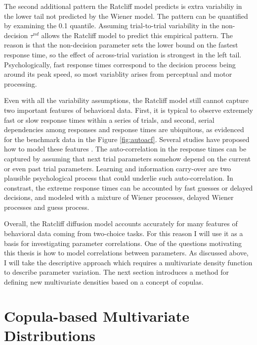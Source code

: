 \documentclass[12pt]{report}
\begin{document}
The second additional pattern the Ratcliff model predicts is extra variabiliy in the lower tail not predicted by the Wiener model. The pattern can be quantified by examining the 0.1 quantile. Assuming trial-to-trial variability in the non-decision $\tau^{nd}$ allows the Ratcliff model to predict this empirical pattern. The reason is that the non-decision parameter sets the lower bound on the fastest response time, so the effect of across-trial variation is strongest in the left tail. Psychologically, fast response times correspond to the decision process being around its peak speed, so most variablity arises from perceptual and motor processing.

Even with all the variability assumptions, the Ratcliff model still cannot capture two important
features of behavioral data. First, it is typical to observe extremely fast or slow response times within a series of trials, and second, serial dependencies among responses and response times are ubiquitous, as evidenced for the benchmark data in the Figure \ref{fig:autoacf}. Several studies have proposed how to model these features \citep{RatTue2002,VanTue2007,GaoWon2009,CraPer2010,JonCur2013}. The auto-correlation in the response times can be captured by assuming that next trial parameters somehow depend on the current or even past trial parameters. Learning and information carry-over are two plausible psychological process that could underlie such auto-correlation.
In constrast, the extreme response times can be accounted by fast guesses or delayed decisions, and modeled with a mixture of Wiener processes, delayed Wiener processes and guess process. 

Overall, the Ratcliff diffusion model accounts accurately for many features of behavioral data coming from two-choice tasks. For this reason I will use it as a basis for investigating parameter correlations. One of the questions motivating this thesis is how to model correlations between parameters. As discussed above, I will take the descriptive approach which requires a multivariate density function to describe parameter variation. The next section introduces a method for defining new multivariate densities based on a concept of copulas.

\section{Copula-based Multivariate Distributions}
\end{document}
